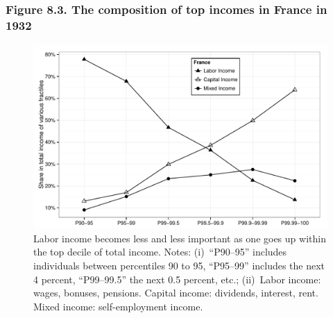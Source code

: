 \documentclass[t]{beamer}\usepackage[]{graphicx}\usepackage[]{color}
\newenvironment{knitrout}{}{} %
\begin{document}
\begin{frame}[label=Figure_8_3,fragile]
\frametitle{Figure 8.3. The composition of top incomes in France in 1932}
\begin{figure}[t]
\begin{minipage}[b]{\textwidth}
\centering
\begin{knitrout}\footnotesize
{}\color{fgcolor}

{\centering \includegraphics[width=1\linewidth]{figures/bw/Figure_8_3} 

}



\end{knitrout}
\caption{\scriptsize{Labor income becomes less and less important as one goes up within the top decile of total income. Notes: (i)~``P90--95'' includes individuals between percentiles 90 to 95, ``P95--99'' includes the next 4 percent, ``P99--99.5'' the next 0.5 percent, etc.; (ii)~Labor income: wages, bonuses, pensions. Capital income: dividends, interest, rent. Mixed income: self-employment income.}}
\end{minipage}
\end{figure}
\end{frame}
\end{document}
